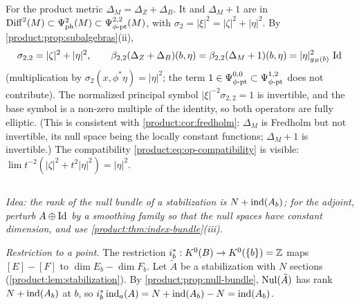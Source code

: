 For the product metric $\Delta_M=\Delta_Z+\Delta_B$. It and $\Delta_M+1$ are in
$\operatorname{Diff}^{2}(M)\subset\Psi^{2}_{\mathrm{ph}}(M)\subset\Psi^{2,2}_{\phi\text{-}\mathrm{pt}}(M)$, with $\sigma_2=|\xi|^2=|\zeta|^2+
|\eta|^2$. By \cref{product:prop:subalgebras}(ii),
\begin{equation*}
\sigma_{2,2}=|\zeta|^2+|\eta|^2,\qquad
\beta_{2,2}(\Delta_Z+\Delta_B)(b,\eta)=\beta_{2,2}(\Delta_M+1)(b,\eta)=|\eta|^2_{g_B(b)}\,\operatorname{Id}
\end{equation*}
(multiplication by $\sigma_2(x,\phi^*\eta)=|\eta|^2$; the term $1\in\Psi^{0,0}_{\phi\text{-}\mathrm{pt}}\subset
\Psi^{1,2}_{\phi\text{-}\mathrm{pt}}$ does not contribute). The normalized principal symbol
$|\xi|^{-2}\sigma_{2,2}=1$ is invertible, and the base symbol is a non-zero multiple of
the identity, so both operators are fully elliptic. (This is consistent with
\cref{product:cor:fredholm}: $\Delta_M$ is Fredholm but not invertible, its null
space being the locally constant functions; $\Delta_M+1$ is invertible.) The compatibility
\eqref{product:eq:op-compatibility} is visible: $\lim t^{-2}(|\zeta|^2+t^2|\eta|^2)=
|\eta|^2$.

\subsection*{}
\emph{Idea: the rank of the null bundle of a stabilization is $N+\operatorname{ind}(A_b)$; for the
adjoint, perturb $A\oplus\operatorname{Id}$ by a smoothing family so that the null spaces have
constant dimension, and use \cref{product:thm:index-bundle}(iii).}

\emph{Restriction to a point.} The restriction $i_b^*:K^0(B)\to K^0(\{b\})=\mathbb{Z}$ maps
$[E]-[F]$ to $\dim E_b-\dim F_b$. Let $\tilde A$ be a stabilization with $N$ sections
(\cref{product:lem:stabilization}). By \cref{product:prop:null-bundle},
$\operatorname{Nul}(\tilde A)$ has rank $N+\operatorname{ind}(A_b)$ at $b$, so
$i_b^*\operatorname{ind}_a(A)=N+\operatorname{ind}(A_b)-N=\operatorname{ind}(A_b)$.

